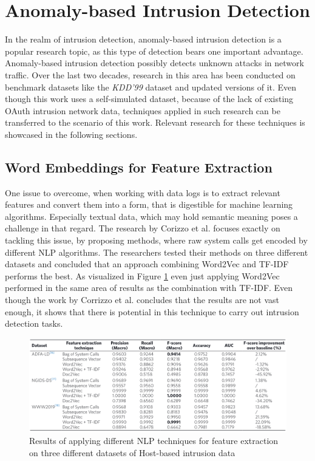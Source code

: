 \section{Anomaly-based Intrusion Detection}
\label{sec:anomaly_based_intrusion_detection}
In the realm of intrusion detection, anomaly-based intrusion detection is a popular research topic, as this type of detection bears one important advantage. Anomaly-based intrusion detection possibly detects unknown attacks in network traffic. Over the last two decades, research in this area has been conducted on benchmark datasets like the \emph{KDD’99} dataset \cite{kdd1999} and updated versions of it. Even though this work uses a self-simulated dataset, because of the lack of existing OAuth intrusion network data, techniques applied in such research can be transferred to the scenario of this work. Relevant research for these techniques is showcased in the following sections.

\subsection{Word Embeddings for Feature Extraction}
One issue to overcome, when working with data logs is to extract relevant features and convert them into a form, that is digestible for machine learning algorithms. Especially textual data, which may hold semantic meaning poses a challenge in that regard. The research by Corizzo et al. \cite{corizzo2020feature} focuses exactly on tackling this issue, by proposing methods, where raw system calls get encoded by different NLP algorithms. The researchers tested their methods on three different datasets and concluded that an approach combining Word2Vec and TF-IDF performs the best. As visualized in Figure \ref{fig:w2v_feat_extr} even just applying Word2Vec performed in the same area of results as the combination with TF-IDF. Even though the work by Corrizzo et al. concludes that the results are not vast enough, it shows that there is potential in this technique to carry out intrusion detection tasks.

\begin{figure}[H]
	\sffamily\footnotesize
	\includegraphics[width=1\textwidth]{pic/w2v_feat_extr.png}
	\unitlength=0.75mm
	\linethickness{0.4pt}
	\caption{Results of applying different NLP techniques for feature extraction on three different datasets of Host-based intrusion data \cite{corizzo2020feature}}
	\label{fig:w2v_feat_extr}
\end{figure}


